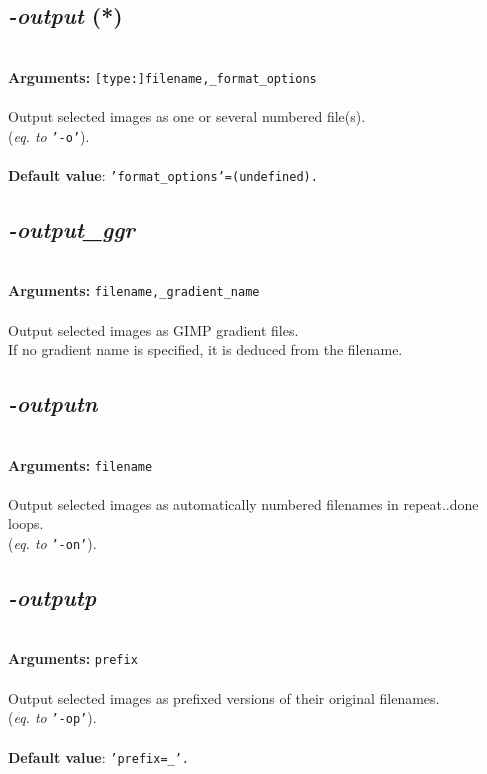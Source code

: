 \documentclass[a4paper,11pt,twoside]{book}
\begin{document}
\subsection{\emph{-output} (*)}\vspace*{-0.5em}
~\\\textbf{Arguments: } 
{\small \texttt{[type:]filename,\_format\_options}}\\~\\
Output selected images as one or several numbered file(s).
~\\(\emph{eq. to} {\small \texttt{'-o'}}).
~\\~\\\textbf{Default value}: {\small \texttt{'format\_options'=(undefined).}}


\subsection{\emph{-output\_ggr} }\vspace*{-0.5em}
~\\\textbf{Arguments: } 
{\small \texttt{filename,\_gradient\_name}}\\~\\
Output selected images as GIMP gradient files.
~\\If no gradient name is specified, it is deduced from the filename.


\subsection{\emph{-outputn} }\vspace*{-0.5em}
~\\\textbf{Arguments: } 
{\small \texttt{filename}}\\~\\
Output selected images as automatically numbered filenames in repeat..done loops.
~\\(\emph{eq. to} {\small \texttt{'-on'}}).


\subsection{\emph{-outputp} }\vspace*{-0.5em}
~\\\textbf{Arguments: } 
{\small \texttt{prefix}}\\~\\
Output selected images as prefixed versions of their original filenames.
~\\(\emph{eq. to} {\small \texttt{'-op'}}).
~\\~\\\textbf{Default value}: {\small \texttt{'prefix=\_'.}}
\end{document}
